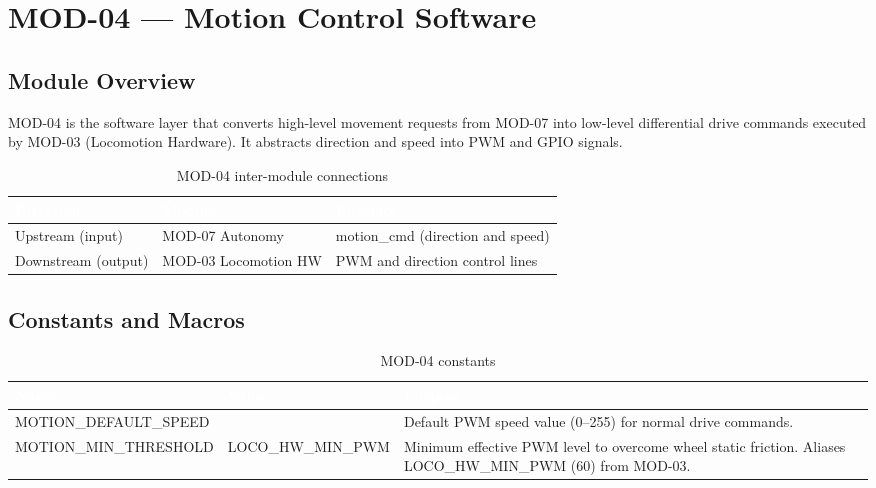 \documentclass[12pt,a4paper]{article}
\newcommand{\theadtext}[1]{\textcolor{white}{\textbf{#1}}}
\newcommand{\fn}[1]{{\footnotesize\ttfamily #1}}
\begin{document}
\newpage

\section{MOD-04 --- Motion Control Software}

\subsection{Module Overview}

MOD-04 is the software layer that converts high-level movement requests from MOD-07
into low-level differential drive commands executed by MOD-03 (Locomotion Hardware).
It abstracts direction and speed into PWM and GPIO signals.

\begin{table}[H]
\centering\small
\begin{tabularx}{\textwidth}{L{2.8cm} L{2.8cm} X}
\toprule
{}
\theadtext{Direction} & \theadtext{Module} & \theadtext{Interface} \\
\midrule
{}   Upstream (input)    & MOD-07 Autonomy & \fn{motion\_cmd} (direction and speed) \\
 Downstream (output) & MOD-03 Locomotion HW & PWM and direction control lines \\
\bottomrule
\end{tabularx}
\caption{MOD-04 inter-module connections}
\end{table}

\subsection{Constants and Macros}

\begin{table}[H]
\centering\small
\begin{tabularx}{\textwidth}{L{5.5cm} L{2.5cm} X}
\toprule
{}
\theadtext{Name} & \theadtext{Value} & \theadtext{Purpose} \\
\midrule
{}   \fn{MOTION\_DEFAULT\_SPEED}    & \fn{150} & Default PWM speed value (0--255) for normal drive commands. \\
 \fn{MOTION\_MIN\_THRESHOLD}    & \fn{LOCO\_HW\_MIN\_PWM} & Minimum effective PWM level to overcome wheel static friction. Aliases \fn{LOCO\_HW\_MIN\_PWM} (60) from MOD-03. \\
\bottomrule
\end{tabularx}
\caption{MOD-04 constants}
\end{table}
\end{document}
